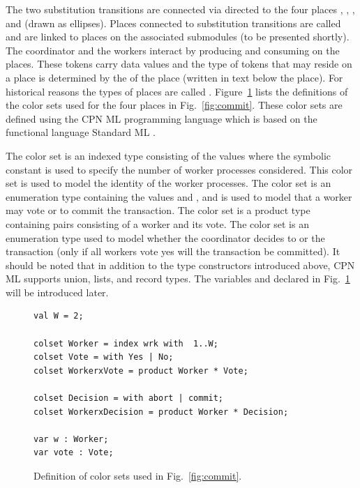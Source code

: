 The two substitution transitions are connected via directed
 to the four places ,
, , and  (drawn
as ellipses). Places connected to substitution transitions are called
 and are linked to  places on the
associated submodules (to be presented shortly). The coordinator and
the workers interact by producing and consuming  on
the places. These tokens carry data values and the type of tokens that
may reside on a place is determined by the  of the place
(written in text below the place). For historical reasons the types of
places are called . Figure~\ref{fig:coloursets}
lists the definitions of the color sets used for the four places in
Fig.~\ref{fig:commit}. These color sets are defined using the CPN ML
programming language which is based on the functional language
Standard ML \cite{X}.

The  color set is an indexed type consisting of the
values  where the symbolic constant
 is used to specify the number of worker processes
considered. This color set is used to model the identity of the worker
processes. The color set  is an enumeration type
containing the values  and , and is used to
model that a worker may vote  or  to commit
the transaction. The color set  is a product type
containing pairs consisting of a worker and its vote. The color set
 is an enumeration type used to model whether the
coordinator decides to  or  the
transaction (only if all workers vote yes will the transaction be
committed). It should be noted that in addition to the type
constructors introduced above, CPN ML supports union, lists, and
record types. The variables  and  declared in
Fig.~\ref{fig:coloursets} will be introduced later.

\begin{figure}[]
\begin{verbatim}
val W = 2;

colset Worker = index wrk with  1..W;
colset Vote = with Yes | No;
colset WorkerxVote = product Worker * Vote;

colset Decision = with abort | commit;
colset WorkerxDecision = product Worker * Decision;

var w : Worker;
var vote : Vote;
\end{verbatim}
\caption{Definition of color sets used in Fig.~\ref{fig:commit}.}
\label{fig:coloursets}
\end{figure}


